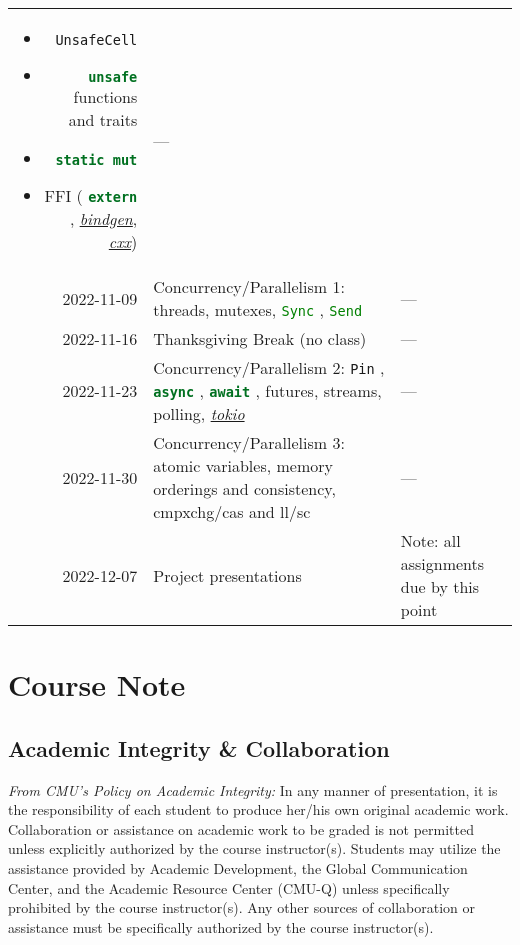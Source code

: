 \documentclass{article}
\newcommand{\code}[2][]{{\sloppy
\ifmmode
\text{\lstinline[language=rust,#1]`#2`}
\else
{\lstinline[language=rust,#1]`#2`}%
\fi}}
\begin{document}
\begin{longtable}{rp{}@{\hskip .05\textwidth}p{}}
\begin{itemize}
                        \item \code{UnsafeCell}
                        \item \code{unsafe} functions and traits
                        \item \code{static mut}
                        \item FFI (\code{extern},
                            \href{https://github.com/rust-lang/rust-bindgen}{\textit{bindgen}},
                            \href{https://github.com/dtolnay/cxx}{\textit{cxx}})
                    \end{itemize}
                & ---                                                       \\
    2022-11-09  & Concurrency/Parallelism 1: threads, mutexes,
                  \code{Sync}, \code{Send}
                & ---                                                       \\
    2022-11-16  & Thanksgiving Break (no class)
                & ---                                                       \\
    2022-11-23  & Concurrency/Parallelism 2: \code{Pin}, \code{async},
                  \code{await}, futures, streams, polling,
                  \href{https://tokio.rs/}{\textit{tokio}}
                & ---                                                       \\
    2022-11-30  & Concurrency/Parallelism 3: atomic variables, memory orderings
                  and consistency, cmpxchg/cas and ll/sc
                & ---                                                       \\
    2022-12-07  & Project presentations
                & Note: all assignments due by this point                   \\
    \bottomrule
\end{longtable}

\section*{Course Note}

\subsection*{Academic Integrity \& Collaboration}

\textit{From CMU's Policy on Academic Integrity:} In any manner of presentation,
it is the responsibility of each student to produce her/his own original
academic work. Collaboration or assistance on academic work to be graded is not
permitted unless explicitly authorized by the course instructor(s). Students may
utilize the assistance provided by Academic Development, the Global
Communication Center, and the Academic Resource Center (CMU-Q) unless
specifically prohibited by the course instructor(s). Any other sources of
collaboration or assistance must be specifically authorized by the course
instructor(s).
 
\end{document}
